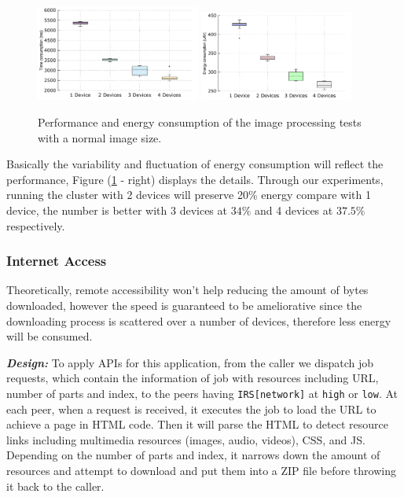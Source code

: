 \documentclass{sig-alternate}[10pt]
\begin{document}
\begin{figure}
	\centering
		\includegraphics[width=0.48\textwidth]{data/img_small_perf_full.pdf}
		\includegraphics[width=0.45\textwidth]{data/img_small_energy.pdf}
	\caption{Performance and energy consumption of the image processing tests with a normal image size.}
	\label{fig:small_img_perf}
\end{figure}

Basically the variability and fluctuation of energy consumption will reflect the performance, Figure (\ref{fig:small_img_perf} - right) displays the details. Through our experiments, running the cluster with 2 devices will preserve 20\% energy compare with 1 device, the number is better with 3 devices at $34\%$ and 4 devices at $37.5\%$ respectively.


\subsubsection{Internet Access} 
Theoretically, remote accessibility won't help reducing the amount of bytes downloaded, however the speed is guaranteed to be ameliorative since the downloading process is scattered over a number of devices, therefore less energy will be consumed. 

\textbf{\emph{Design:}}
To apply APIs for this application, from the caller we dispatch job requests, which contain the information of job with resources including URL, number of parts and index, to the peers having \texttt{IRS[network]} at \texttt{high} or \texttt{low}. At each peer, when a request is received, it executes the job to load the URL to achieve a page in HTML code. Then it will parse the HTML to detect resource links including multimedia resources (images, audio, videos), CSS, and JS. Depending on the number of parts and index, it narrows down the amount of resources and attempt to download and put them into a ZIP file before throwing it back to the caller.
\end{document}
